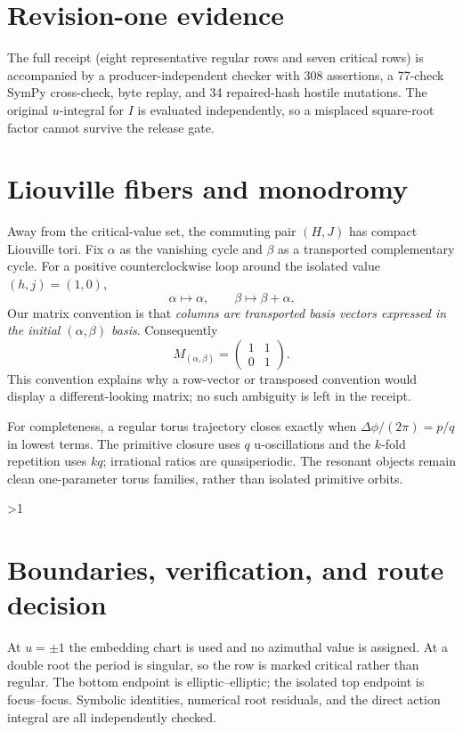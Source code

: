 \documentclass[10pt]{article}
\begin{document}
\section{Revision-one evidence}
The full receipt (eight representative regular rows and seven critical rows) is accompanied by a
producer-independent checker with 308 assertions, a 77-check SymPy
cross-check, byte replay, and 34 repaired-hash hostile mutations.  The
original \(u\)-integral for \(I\) is evaluated independently, so a misplaced
square-root factor cannot survive the release gate.
\fi

\section{Liouville fibers and monodromy}
Away from the critical-value set, the commuting pair \((H,J)\) has compact
Liouville tori.  Fix \(\alpha\) as the vanishing cycle and \(\beta\) as a
transported complementary cycle.  For a positive counterclockwise loop around
the isolated value \((h,j)=(1,0)\),
\[
\alpha\longmapsto\alpha,\qquad \beta\longmapsto\beta+\alpha .
\]
Our matrix convention is that \emph{columns are transported basis vectors
expressed in the initial \((\alpha,\beta)\) basis}.  Consequently
\begin{equation}
 M_{(\alpha,\beta)}=
 \begin{pmatrix}1&1\\0&1\end{pmatrix}.                    \label{eq:mono}
\end{equation}
This convention explains why a row-vector or transposed convention would
display a different-looking matrix; no such ambiguity is left in the receipt.

For completeness, a regular torus trajectory closes exactly when
\(\Delta\phi/(2\pi)=p/q\) in lowest terms.  The primitive closure uses \(q\)
u-oscillations and the \(k\)-fold repetition uses \(kq\); irrational ratios
are quasiperiodic.  The resonant objects remain clean one-parameter torus
families, rather than isolated primitive orbits.

\ifnum\CRevisionRound>1
\section{Boundaries, verification, and route decision}
At \(u=\pm1\) the embedding chart is used and no azimuthal value is assigned.
At a double root the period is singular, so the row is marked critical rather
than regular.  The bottom endpoint is elliptic--elliptic; the isolated top
endpoint is focus--focus.  Symbolic identities, numerical root residuals, and
the direct action integral are all independently checked.
\end{document}
